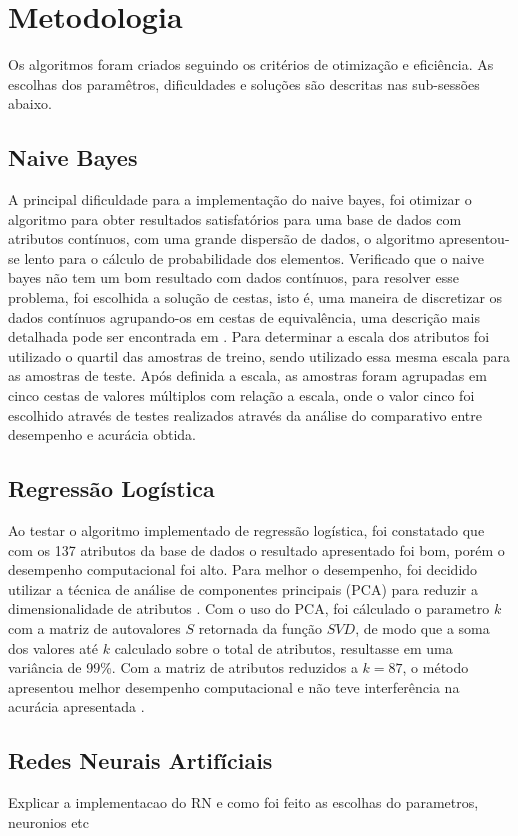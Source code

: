 \documentclass[10pt, conference, compsocconf]{IEEEtran}
\begin{document}
\section{Metodologia}\label{metodologia}
Os algoritmos foram criados seguindo os critérios de otimização e eficiência. As escolhas dos paramêtros, dificuldades e soluções são descritas nas sub-sessões abaixo.
\subsection{Naive Bayes}
A principal dificuldade para a implementação do naive bayes, foi otimizar o algoritmo para obter resultados satisfatórios  para uma base de dados com atributos contínuos, com uma grande dispersão de dados, o algoritmo apresentou-se lento para o cálculo de probabilidade dos elementos. 
Verificado que o naive bayes não tem um bom resultado com dados contínuos, para resolver esse problema, foi escolhida a solução de cestas, isto é, uma maneira de discretizar os dados contínuos agrupando-os em cestas de equivalência, uma descrição mais detalhada pode ser encontrada em \cite{8}. 
Para determinar a escala dos atributos foi utilizado o quartil das amostras de treino, sendo utilizado essa mesma escala para as amostras de teste. Após definida a escala, as amostras foram agrupadas em cinco cestas de valores múltiplos com relação a escala, onde o valor cinco foi escolhido através de testes realizados através da análise do comparativo entre desempenho e acurácia obtida.
\subsection{Regressão Logística}
Ao testar o algoritmo implementado de regressão logística, foi constatado que com os 137 atributos da base de dados o resultado apresentado foi bom, porém o desempenho computacional foi alto. Para melhor o desempenho, foi decidido utilizar a técnica de análise de componentes principais (PCA) para reduzir a dimensionalidade de atributos \cite{9}. 
Com o uso do PCA, foi cálculado o parametro $k$ com a matriz de autovalores $S$ retornada da função $SVD$, de modo que a soma dos valores até $k$ calculado sobre o total de atributos, resultasse em uma variância de 99\%. Com a matriz de atributos reduzidos a $k=87$, o  método apresentou melhor desempenho computacional e não teve interferência na acurácia apresentada . 
\subsection{Redes Neurais Artifíciais}
Explicar a implementacao do RN e como foi feito as escolhas do parametros, neuronios etc
\end{document}
